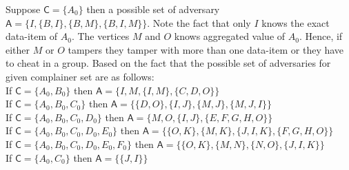 \begin{exmp}
			Suppose $\textsf{C}=\{A_{0}\}$ then a possible set of adversary $\textsf{A} =\{I,\{B,I\},\{B,M\},\{B,I,M\}\}$. 
			Note the fact that only $I$ knows the exact data-item of $A_{0}$. 
			The vertices $M$ and $O$ knows aggregated value of $A_{0}$. 
			Hence, if either $M$ or $O$ tampers they tamper with more than one data-item or they have to cheat in a group. 
			Based on the fact that the possible set of adversaries for given complainer set are as follows:\\
			If $\textsf{C}=\{A_{0},B_{0}\}$ then $\textsf{A}=\{I,M,\{I,M\},\{C,D,O\}\}$\\
			If $\textsf{C}=\{A_{0},B_{0},C_{0}\}$ then $\textsf{A}=\{\{D,O\},\{I,J\},\{M,J\},\{M,J,I\}\}$\\				
			If $\textsf{C}=\{A_{0},B_{0},C_{0},D_{0}\}$ then $\textsf{A}=\{M, O,\{I,J\},\{E,F,G,H,O\}\}$\\			
			If $\textsf{C}=\{A_{0},B_{0},C_{0},D_{0},E_{0}\}$ then $\textsf{A}=\{\{O,K\},\{M,K\},\{J,I,K\},\{F,G,H,O\}\}$\\				
			If $\textsf{C}=\{A_{0},B_{0},C_{0},D_{0},E_{0},F_{0}\}$ then $\textsf{A}=\{\{O,K\},\{M,N\},\{N,O\},\{J,I,K\}\}$\\
			If $\textsf{C}=\{A_{0},C_{0}\}$ then $\textsf{A}= \{ \{J,I\}\}$
		\end{exmp}

